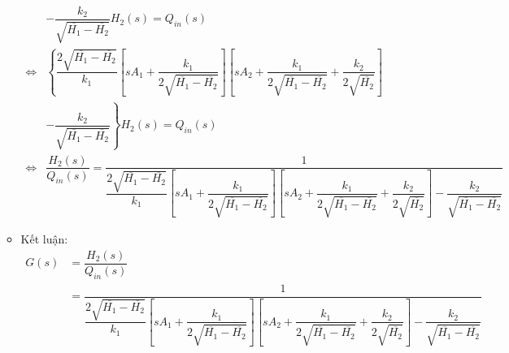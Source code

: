 \begin{enumerate}[\it a.]
\begin{itemize}
\begin{align}
                            & - \dfrac{k_2}{\sqrt{\overline{H_1} - \overline{H_2}}} H_2(s) = Q_{in}(s) \\
                            \Longleftrightarrow & \left\{{\dfrac{2\sqrt{\overline{H_1} - \overline{H_2}}}{k_1} \left[{s A_1 + \dfrac{k_1}{2\sqrt{\overline{H_1} - \overline{H_2}}}}\right] \left[{s A_2 + \dfrac{k_1}{2 \sqrt{\overline{H_1} - \overline{H_2}}} + \dfrac{k_2}{2 \sqrt{\overline{H_2}}}}\right]}\right. \nonumber \\
                            & \left.{- \dfrac{k_2}{\sqrt{\overline{H_1} - \overline{H_2}}}}\right\} H_2(s) = Q_{in}(s) \\
                            \Longleftrightarrow & \dfrac{H_2(s)}{Q_{in}(s)} = \dfrac{1}{\dfrac{2\sqrt{\overline{H_1} - \overline{H_2}}}{k_1} \left[{s A_1 + \dfrac{k_1}{2\sqrt{\overline{H_1} - \overline{H_2}}}}\right] \left[{s A_2 + \dfrac{k_1}{2 \sqrt{\overline{H_1} - \overline{H_2}}} + \dfrac{k_2}{2 \sqrt{\overline{H_2}}}}\right] - \dfrac{k_2}{\sqrt{\overline{H_1} - \overline{H_2}}}}
                        \end{align}

                    \item Kết luận:
                        \begin{align}
                            G(s) & = \dfrac{H_2(s)}{Q_{in}(s)} \nonumber\\
                            & = \dfrac{1}{\dfrac{2\sqrt{\overline{H_1} - \overline{H_2}}}{k_1} \left[{s A_1 + \dfrac{k_1}{2\sqrt{\overline{H_1} - \overline{H_2}}}}\right] \left[{s A_2 + \dfrac{k_1}{2 \sqrt{\overline{H_1} - \overline{H_2}}} + \dfrac{k_2}{2 \sqrt{\overline{H_2}}}}\right] - \dfrac{k_2}{\sqrt{\overline{H_1} - \overline{H_2}}}}
                        \end{align}
                \end{itemize}
        \end{enumerate}
